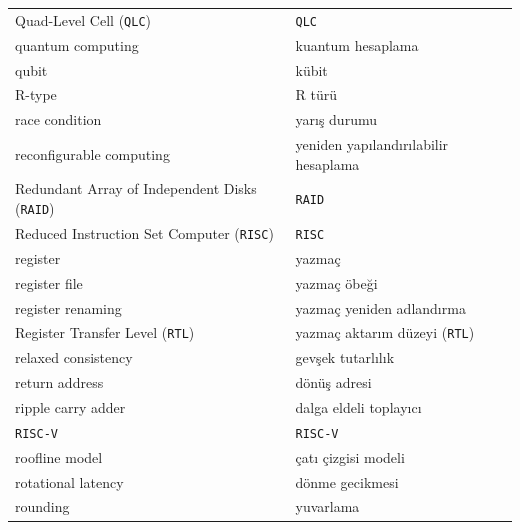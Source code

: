 {\begin{longtable}{@{}p{7.6cm}p{7.6cm}@{}}
Quad-Level Cell (\texttt{QLC}) & \texttt{QLC} \\
quantum computing & kuantum hesaplama \\
qubit & kübit \\

R-type & R türü \\
race condition & yarış durumu \\
reconfigurable computing & yeniden yapılandırılabilir hesaplama \\
Redundant Array of Independent Disks (\texttt{RAID}) & \texttt{RAID} \\
Reduced Instruction Set Computer (\texttt{RISC}) & \texttt{RISC} \\
register & yazmaç \\
register file & yazmaç öbeği \\
register renaming & yazmaç yeniden adlandırma \\
Register Transfer Level (\texttt{RTL}) & yazmaç aktarım düzeyi (\texttt{RTL}) \\
relaxed consistency & gevşek tutarlılık \\
return address & dönüş adresi \\
ripple carry adder & dalga eldeli toplayıcı \\
\texttt{RISC-V} & \texttt{RISC-V} \\
roofline model & çatı çizgisi modeli \\
rotational latency & dönme gecikmesi \\
rounding & yuvarlama \\


\end{longtable}}
